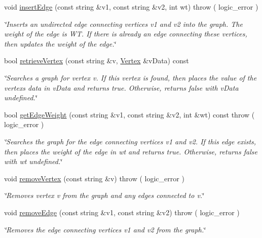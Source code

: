 \begin{DoxyCompactItemize}
void \hyperlink{class_weighted_graph_a6f59ad223d921324c3ec629d0d6e4eea}{insert\+Edge} (const string \&v1, const string \&v2, int wt)  throw ( logic\+\_\+error )
\begin{DoxyCompactList}\small\item\em \char`\"{}\+Inserts an undirected edge connecting vertices v1 and v2 into the graph. The weight of the edge is W\+T. If there is already an edge connecting these vertices, then updates the weight of the edge.\char`\"{} \end{DoxyCompactList}\item 
bool \hyperlink{class_weighted_graph_a3afabc2236c99dac950f5161f715f114}{retrieve\+Vertex} (const string \&v, \hyperlink{class_weighted_graph_1_1_vertex}{Vertex} \&v\+Data) const 
\begin{DoxyCompactList}\small\item\em \char`\"{}\+Searches a graph for vertex v. If this vertex is found, then places the value of the vertex\textquotesingle{}s data in v\+Data and returns true. Otherwise, returns false with v\+Data undefined.\char`\"{} \end{DoxyCompactList}\item 
bool \hyperlink{class_weighted_graph_ab136044e7378313087be69eb43e7f042}{get\+Edge\+Weight} (const string \&v1, const string \&v2, int \&wt) const   throw ( logic\+\_\+error )
\begin{DoxyCompactList}\small\item\em \char`\"{}\+Searches the graph for the edge connecting vertices v1 and v2. If this edge exists, then places the weight of the edge in wt and returns true. Otherwise, returns false with wt undefined.\char`\"{} \end{DoxyCompactList}\item 
void \hyperlink{class_weighted_graph_abaaa572a9b1a60ec3cd99d8db9d9590e}{remove\+Vertex} (const string \&v)  throw ( logic\+\_\+error )
\begin{DoxyCompactList}\small\item\em \char`\"{}\+Removes vertex v from the graph and any edges connected to v.\char`\"{} \end{DoxyCompactList}\item 
void \hyperlink{class_weighted_graph_a1db455249fa7fedf70aa5683487a17df}{remove\+Edge} (const string \&v1, const string \&v2)  throw ( logic\+\_\+error )
\begin{DoxyCompactList}\small\item\em \char`\"{}\+Removes the edge connecting vertices v1 and v2 from the graph.\char`\"{} \end{DoxyCompactList}\item 

\end{DoxyCompactItemize}
